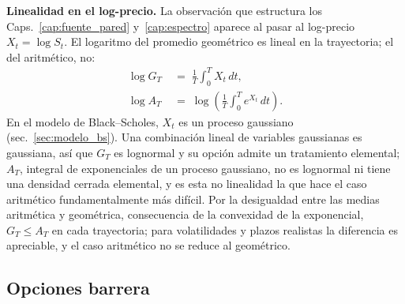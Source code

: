 \medskip

\noindent\textbf{Linealidad en el log-precio.}
La observación que estructura los Caps.~\ref{cap:fuente_pared}
y~\ref{cap:espectro}\enprep{} aparece al pasar al log-precio $X_t = \log S_t$.
El logaritmo del promedio geométrico es lineal en la trayectoria; el
del aritmético, no:
\begin{align}
  \log G_T &\;=\; \frac{1}{T}\int_0^T X_t\, dt,
  \label{eq:log_geom_lineal}\\
  \log A_T &\;=\; \log\!\left(\frac{1}{T}\int_0^T e^{X_t}\, dt\right).
  \label{eq:log_arit_no_lineal}
\end{align}
En el modelo de Black--Scholes, $X_t$ es un proceso gaussiano
(sec.~\ref{sec:modelo_bs}). Una combinación lineal de variables
gaussianas es gaussiana, así que $G_T$ es lognormal y su opción admite
un tratamiento elemental; $A_T$, integral de exponenciales de un
proceso gaussiano, no es lognormal ni tiene una densidad cerrada
elemental, y es esta no linealidad la que hace el caso aritmético
fundamentalmente más difícil. Por la desigualdad entre las medias
aritmética y geométrica, consecuencia de la convexidad de la
exponencial, $G_T \leq A_T$ en cada trayectoria; para volatilidades y
plazos realistas la diferencia es apreciable, y el caso aritmético no
se reduce al geométrico.

\subsection{Opciones barrera}
\label{subsec:barrera_unica_payoff}\label{sec:barrera_definicion}
\label{subsec:doble_barrera_otros_tipos}

